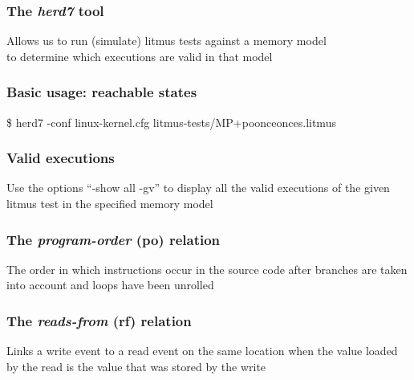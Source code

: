 \documentclass[usenames,dvipsnames]{beamer}
\begin{document}
\begin{frame}[fragile]
\frametitle{The \emph{herd7} tool}

Allows us to run (simulate) litmus tests against a memory model \\
to determine which executions are valid in that model

\end{frame}


\begin{frame}[fragile]
\frametitle{Basic usage: reachable states}

\begin{center}
\$ herd7 -conf linux-kernel.cfg litmus-tests/MP+poonceonces.litmus
\end{center}

\end{frame}


\begin{frame}[fragile]
\frametitle{Valid executions}

Use the options ``-show all -gv'' to display all the valid executions of
the given litmus test in the specified memory model

\end{frame}


\begin{frame}[fragile]
\frametitle{The \emph{program-order} (po) relation}

The order in which instructions occur in the source code after branches
are taken into account and loops have been unrolled

\end{frame}


\begin{frame}[fragile]
\frametitle{The \emph{reads-from} (rf) relation}

Links a write event to a read event on the same location when the value
loaded by the read is the value that was stored by the write

\end{frame}
\end{document}
